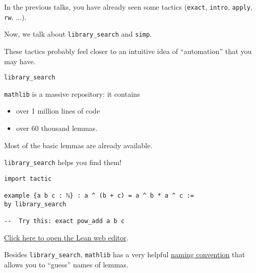 \documentclass{beamer}
\begin{document}
\begin{frame}[fragile]

In the previous talks, you have already seen some tactics ({\color{violet}\verb`exact`}, {\color{violet}\verb`intro`}, {\color{violet}\verb`apply`}, {\color{violet}\verb`rw`}, ...).

Now, we talk about {\color{violet}\verb`library_search`} and {\color{violet}\verb`simp`}.

These tactics probably feel closer to an intuitive idea of ``automation'' that you may have.
\end{frame}

\begin{frame}[fragile]{{\color{violet}\texttt{library\_search}}}

{\color{violet}\verb`mathlib`} is a massive repository: it contains
\vspace{-13pt}
\begin{itemize}
\setlength\itemsep{-12pt}
\item
  over 1 million lines of code
\item
  over 60 thousand lemmas.
\end{itemize}

Most of the basic{\footnotemark} lemmas are already available.

{\color{violet}\verb`library_search`} helps you find them!

\end{frame}

\begin{frame}[fragile]

\begin{verbatim}
import tactic

example {a b c : ℕ} : a ^ (b + c) = a ^ b * a ^ c :=
by library_search

--  Try this: exact pow_add a b c
\end{verbatim}

\vspace{-17pt}
{\small{\href{https://leanprover-community.github.io/lean-web-editor/#code=import%20tactic%0A%0Aexample%20%7Ba%20b%20c%20%3A%20%E2%84%95%7D%20%3A%20a%20%5E%20%28b%20%2B%20c%29%20%3D%20a%20%5E%20b%20*%20a%20%5E%20c%20%3A%3D%0Aby%20library_search}{Click here to open the Lean web editor}.}}

\bigskip

Besides {\color{violet}\verb`library_search`}, {\color{violet}\verb`mathlib`} has a very helpful \href{https://leanprover-community.github.io/contribute/naming.html}{naming convention} that allows you to ``guess'' names of lemmas.
\end{frame}
\end{document}
